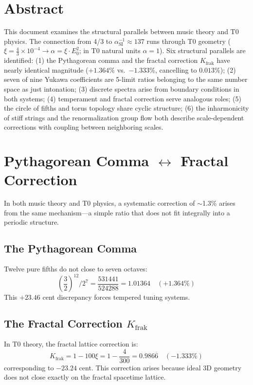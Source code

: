 \section*{Abstract}
This document examines the structural parallels between music theory and T0 physics. The connection from 4/3 to $\alpha_\text{SI}^{-1} \approx 137$ runs through T0 geometry ($\xi = \frac{4}{3} \times 10^{-4} \to \alpha = \xi \cdot E_0^2$; in T0 natural units $\alpha = 1$). Six structural parallels are identified: (1) the Pythagorean comma and the fractal correction $K_\text{frak}$ have nearly identical magnitude ($+1.364\%$ vs.\ $-1.333\%$, cancelling to $0.013\%$); (2) seven of nine Yukawa coefficients are 5-limit ratios belonging to the same number space as just intonation; (3) discrete spectra arise from boundary conditions in both systems; (4) temperament and fractal correction serve analogous roles; (5) the circle of fifths and torus topology share cyclic structure; (6) the inharmonicity of stiff strings and the renormalization group flow both describe scale-dependent corrections with coupling between neighboring scales.

\section{\texorpdfstring{Pythagorean Comma $\leftrightarrow$ Fractal Correction}{Pythagorean Comma -- Fractal Correction}}

In both music theory and T0 physics, a systematic correction of $\sim$1.3\% arises from the same mechanism---a simple ratio that does not fit integrally into a periodic structure.

\subsection{The Pythagorean Comma}

Twelve pure fifths do not close to seven octaves:
\begin{equation}
	\left(\frac{3}{2}\right)^{12} \Big/ 2^7 = \frac{531441}{524288} = 1.01364 \quad (+1.364\%)
\end{equation}
This $+23.46$ cent discrepancy forces tempered tuning systems.

\subsection{The Fractal Correction $K_\text{frak}$}

In T0 theory, the fractal lattice correction is:
\begin{equation}
	K_\text{frak} = 1 - 100\xi = 1 - \frac{4}{300} = 0.986\overline{6} \quad (-1.333\%)
\end{equation}
corresponding to $-23.24$ cent. This correction arises because ideal 3D geometry does not close exactly on the fractal spacetime lattice.

